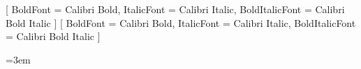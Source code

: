 %

\usepackage{fontspec}
\setmainfont{Calibri}[
  BoldFont = Calibri Bold,
  ItalicFont = Calibri Italic,
  BoldItalicFont = Calibri Bold Italic
]
\setsansfont{Calibri}[
  BoldFont = Calibri Bold,
  ItalicFont = Calibri Italic,
  BoldItalicFont = Calibri Bold Italic
]
\setmonofont{Consolas}

\usepackage{amsmath}
\usepackage{amssymb}

\renewcommand{\texttt}[1]{\textsf{#1}}

\usepackage{setspace}

\usepackage[none]{hyphenat}

\emergencystretch=3em
\setlength{\hfuzz}{2pt}


